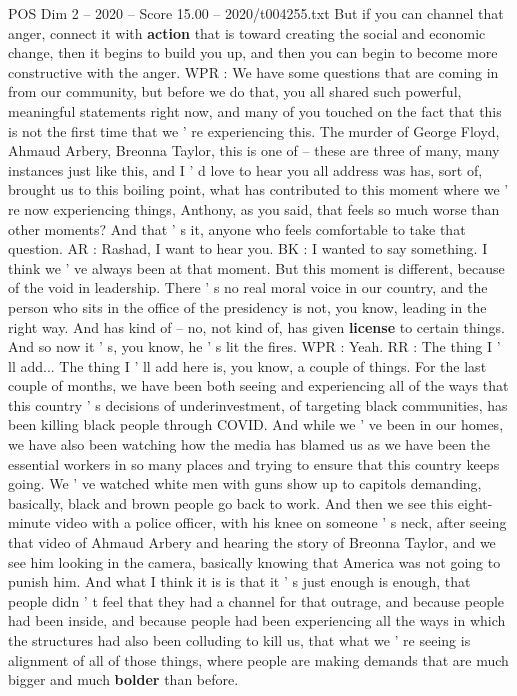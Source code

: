 \begin{textsample}{POS Dim 2 – 2020 – Score 15.00 – 2020/t004255.txt}
But if you can channel that anger, connect it with \textbf{action} that is toward creating the social and economic change, then it begins to build you up, and then you can begin to become more constructive with the anger.
WPR : We have some questions that are coming in from our community, but before we do that, you all shared such powerful, meaningful statements right now, and many of you touched on the fact that this is not the first time that we ' re experiencing this.
The murder of George Floyd, Ahmaud Arbery, Breonna Taylor, this is one of -- these are three of many, many instances just like this, and I ' d love to hear you all address was has, sort of, brought us to this boiling point, what has contributed to this moment where we ' re now experiencing things, Anthony, as you said, that feels so much worse than other moments?
And that ' s it, anyone who feels comfortable to take that question.
AR : Rashad, I want to hear you.
BK : I wanted to say something.
I think we ' ve always been at that moment.
But this moment is different, because of the void in leadership.
There ' s no real moral voice in our country, and the person who sits in the office of the presidency is not, you know, leading in the right way.
And has kind of -- no, not kind of, has given \textbf{license} to certain things.
And so now it ' s, you know, he ' s lit the fires.
WPR : Yeah.
RR : The thing I ' ll add...
The thing I ' ll add here is, you know, a couple of things.
For the last couple of months, we have been both seeing and experiencing all of the ways that this country ' s decisions of underinvestment, of targeting black communities, has been killing black people through COVID.
And while we ' ve been in our homes, we have also been watching how the media has blamed us as we have been the essential workers in so many places and trying to ensure that this country keeps going.
We ' ve watched white men with guns show up to capitols demanding, basically, black and brown people go back to work.
And then we see this eight-minute video with a police officer, with his knee on someone ' s neck, after seeing that video of Ahmaud Arbery and hearing the story of Breonna Taylor, and we see him looking in the camera, basically knowing that America was not going to punish him.
And what I think it is is that it ' s just enough is enough, that people didn ' t feel that they had a channel for that outrage, and because people had been inside, and because people had been experiencing all the ways in which the structures had also been colluding to kill us, that what we ' re seeing is alignment of all of those things, where people are making demands that are much bigger and much \textbf{bolder} than before.

\end{textsample}
